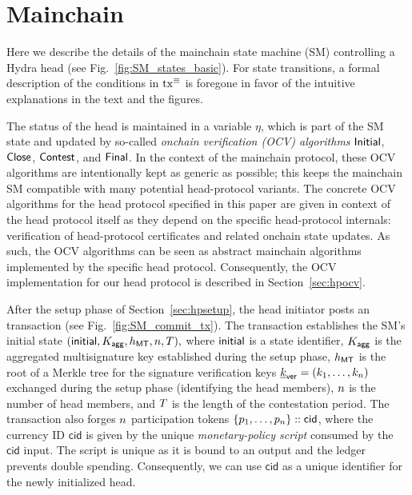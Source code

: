\section{Mainchain}
\label{sec:mainchain}

Here we describe the details of the mainchain state
machine (SM) controlling a Hydra head (see
Fig.~\ref{fig:SM_states_basic}).  For state transitions, a formal
description of the conditions in $\mathrm{tx}^\equiv$ is foregone in favor of
the intuitive explanations in the text and the figures.

 The status of the head
is maintained in a variable $\eta$, which is part of the SM state and
updated by so-called \emph{onchain verification (OCV) algorithms}
$\mathsf{Initial}$, $\mathsf{Close}$, $\mathsf{Contest}$, and $\mathsf{Final}$. In the context
of the mainchain protocol, these OCV algorithms are intentionally kept
as generic as possible; this keeps the mainchain SM compatible with
many potential head-protocol variants.
The concrete OCV algorithms for the head protocol specified in this
paper are given in context of the head protocol itself as they depend
on the specific head-protocol internals: verification of head-protocol
certificates and related onchain state updates.
As such, the OCV algorithms can be seen as abstract mainchain algorithms
implemented by the specific head protocol. Consequently, the OCV
implementation for our head protocol is described in Section~\ref{sec:hpocv}.



  After the setup phase of Section~\ref{sec:hpsetup},
the head initiator posts an \mtxInit{} transaction (see
Fig.~\ref{fig:SM_commit_tx}).  The \mtxInit{} transaction
establishes the SM's initial state
\(
  (\mathsf{initial},K_{\mathsf{agg}},h_{\mathsf{MT}},n,T),
\)
where $\mathsf{initial}$ is a state identifier, $K_{\mathsf{agg}}$ is the aggregated multisignature
key established during the setup phase, $h_{\mathsf{MT}}$ is the root of a Merkle tree for
the signature verification keys $\underline{k}_{\mathsf{ver}}=(k_1,\ldots,k_n)$ exchanged during the
setup phase (identifying the head members), $n$
is the number of head members, and $T$ is the length of the
contestation period.  The \mtxInit{} transaction also forges $n$
participation tokens $\{p_1,\ldots,p_n\} :: \mathsf{cid}$, where
the currency ID $\mathsf{cid}$ is given by the unique \emph{monetary-policy script}
consumed by the $\mathsf{cid}$ input. The script is unique as it is bound to
an output and the ledger prevents double spending. Consequently, we can
use $\mathsf{cid}$ as a unique identifier for the newly initialized head.

